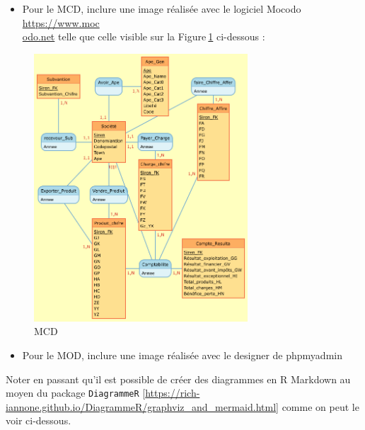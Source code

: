 \documentclass[mstat,12pt]{unswthesis}
\begin{document}
\begin{itemize}
\tightlist
\item
  Pour le MCD, inclure une image réalisée avec le logiciel Mocodo
  \href{https://www.mocodo.net/?mcd=eNqNksFu2zAMhu96Ch0dQAOW7Zab67ZK2zTL4ixtcjEUh14FOJKhyFm3N_J9b-AX62_HaOMEAwb4Ay1SIvlLjMvNQRmvrRnxWDsywe3DQPD43R296MwRCw9Wu7AgMRzy2Ka6rnxdieGUwyfJsKMZNUsBpmrX2kj5z50ddvZLZ7-Kid5QniNNZLfEMoXyTTWUC7OM3EWpLpggiq2j0BgixhyldLClQ8uC945wnPkQ0u1_D49auYJfk7E7fdwjeNNKYfde5WJhf8GBZtlM_SYXvSj380w_b7tq_Ena3lNX5KzT05u9DcE1kOAePIIp-AZm4DuYM3bzWljnyc2c3ZbaX9btAv3CSzJbR01Il_97pi-g12sMFuAHWIIn8AxWYC24_PNp9cxGDN9Z5pMsEiLlA5gAiJUQKyFWQuwYlzG-AhHApaxvBF8h-WrNIrsrvNroXHtqH79Z05z2Ze5VTxm_nA1xoVX866VO0_bEz-uqdfqEXovcavxhQgIpe7FMG2VSTS6Qy4H48Ktm6hK9K-q_fh_Ip7OEKRVNNkN5ML5DbGExcUlxbHkfjCcDcXSlbc_wPGLXVV2Zusp0SklBGI5gPB2wN-SeTJ4=}{https://www.moc\\odo.net}
  telle que celle visible sur la Figure\(~\)\ref{MCD} ci-dessous :
\end{itemize}

\begin{figure}
\centering
\includegraphics[width=8cm,height=10cm]{MCD.png}
\caption{MCD}\label{MCD}
\end{figure}

\begin{itemize}
\tightlist
\item
  Pour le MOD, inclure une image réalisée avec le designer de phpmyadmin
\end{itemize}

\bigskip

Noter en passant qu'il est possible de créer des diagrammes en R
Markdown au moyen du package \texttt{DiagrammeR}
{[}\url{https://rich-iannone.github.io/DiagrammeR/graphviz_and_mermaid.html}{]}
comme on peut le voir ci-dessous.
\end{document}
